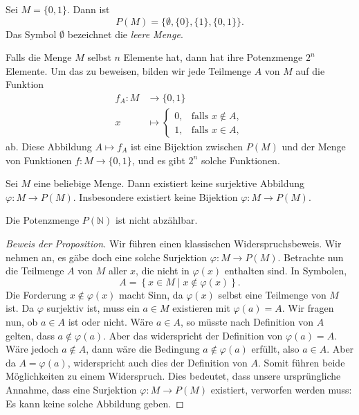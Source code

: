 \documentclass[../main.tex]{subfiles}
\begin{document}
\begin{example}
  Sei $M = \{0, 1\}$. Dann ist
  \[
    P(M) = \{ \emptyset, \{0\}, \{1\}, \{0, 1\}\}.
  \]
  Das Symbol $\emptyset$ bezeichnet die \emph{leere Menge}.
\end{example}

\begin{remark}
  Falls die Menge $M$ selbst $n$ Elemente hat, dann hat ihre
  Potenzmenge $2^{n}$ Elemente. Um das zu beweisen,
  bilden wir jede Teilmenge $A$ von $M$
  auf die Funktion
  \begin{align*}
    f_{A} \colon  M &\to \{0, 1\} \\
     x &\mapsto
      \begin{cases}
        0, & \mbox{falls } x \notin A, \\
        1, & \mbox{falls } x \in A,
      \end{cases}
  \end{align*}
  ab.
  Diese Abbildung $A \mapsto f_{A}$ ist eine Bijektion zwischen
  $P(M)$ und der Menge von Funktionen $f \colon M \to \{0, 1\}$,
  und es gibt $2^{n}$
  solche Funktionen.
\end{remark}

\begin{proposition}[Cantor]\label{prop:cantor}
  Sei $M$ eine beliebige Menge.
  Dann existiert keine surjektive Abbildung $\varphi \colon M \to P(M)$.
  Insbesondere existiert keine Bijektion $\varphi \colon M \to P(M)$.
\end{proposition}

\begin{corollary}
  Die Potenzmenge $P(\mathbb N)$ ist nicht abzählbar.
\end{corollary}

\begin{proof}[Beweis der Proposition]
  Wir führen einen klassischen Widerspruchsbeweis.
  Wir nehmen an, es gäbe doch eine solche Surjektion
  $\varphi \colon M \to P(M)$.
  Betrachte nun die Teilmenge $A$ von $M$ aller $x$, die nicht
  in $\varphi(x)$ enthalten sind. In Symbolen,
  \[
    A = \left\{x \in M \mid x \notin \varphi(x)\right\}.
  \]
  Die Forderung $x \notin \varphi(x)$ macht Sinn,
  da $\varphi(x)$ selbst eine Teilmenge von $M$ ist.
  Da $\varphi$ surjektiv ist, muss ein $a \in M$
  existieren mit $\varphi(a) = A$. Wir fragen nun,
  ob $a \in A$ ist oder nicht.
  Wäre $a \in A$, so müsste nach Definition von $A$
  gelten, dass $a \notin \varphi(a)$. Aber das
  widerspricht der Definition von $\varphi(a) = A$.
  Wäre jedoch $a \notin A$, dann wäre die Bedingung
  $a \notin \varphi(a)$ erfüllt, also $a \in A$.
  Aber da $A = \varphi(a)$, widerspricht auch dies
  der Definition von $A$. Somit führen beide Möglichkeiten
  zu einem Widerspruch. Dies bedeutet, dass unsere
  ursprüngliche Annahme, dass eine Surjektion
  $\varphi \colon M \to P(M)$ existiert, verworfen werden muss:
  Es kann keine solche Abbildung geben.
\end{proof}
\end{document}
